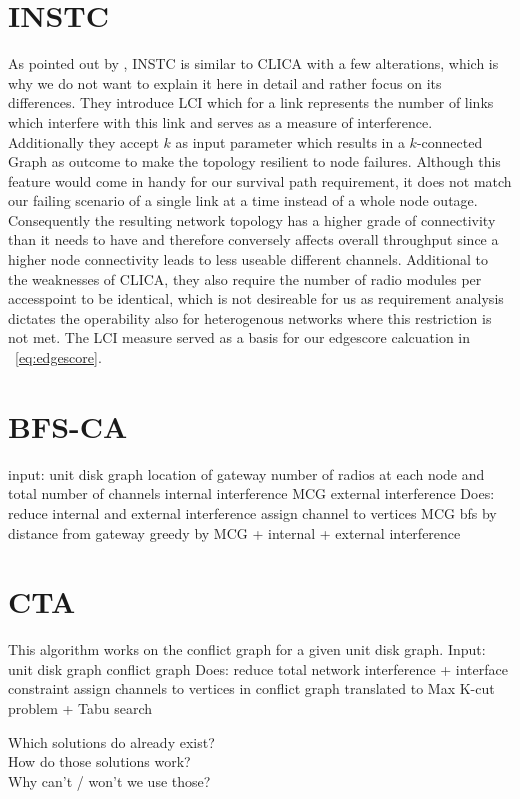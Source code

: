\section{\ac{INSTC}}
  As pointed out by \cite{overview_caa}, INSTC \cite{INSTC} is similar to \ac{CLICA} with a few alterations, which is why we do not want to explain it here in detail and rather focus on
  its differences. They introduce \ac{LCI} which for a link represents the number of links which interfere with this link \cite{overview_caa} and serves as a measure of 
  interference. Additionally they accept \(k\) as input parameter which results in a \(k\)-connected Graph as outcome to make the topology resilient to node failures.
  Although this feature would come in handy for our survival path requirement, it does not match our failing scenario of a single link at a time instead of a whole node outage.
  Consequently the resulting network topology has a higher grade of connectivity than it needs to have and therefore conversely affects overall throughput since a higher
  node connectivity leads to less useable different channels. Additional to the weaknesses of \ac{CLICA}, they also require the number
  of radio modules per accesspoint to be identical, which is not desireable for us as requirement analysis dictates the operability also for heterogenous networks where this
  restriction is not met. The LCI measure served as a basis for our edgescore calcuation in ~\ref{eq:edgescore}.
  
\section{\ac{BFS-CA}}
  input: unit disk graph
	 location of gateway
	 number of radios at each node and total number of channels
	 internal interference MCG
	 external interference
  Does: reduce internal and external interference
	assign channel to vertices MCG
	bfs by distance from gateway
	greedy by MCG + internal + external interference
  \cite{BFS-CA}
\section{\ac{CTA}}
  This algorithm works on the conflict graph for a given unit disk graph.
  Input: unit disk graph
	 conflict graph
  Does: reduce total network interference + interface constraint
	assign channels to vertices in conflict graph
	translated to Max K-cut problem + Tabu search
  \cite{CTA}

\begin{description}
 \item [Which solutions do already exist?]
 \item[How do those solutions work?]
 \item[Why can't / won't we use those?]
\end{description}